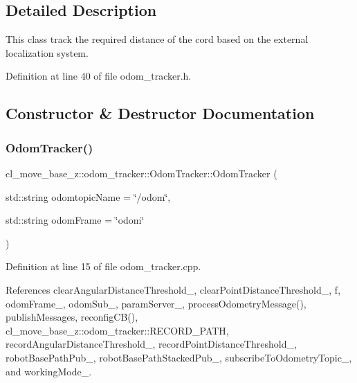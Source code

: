 \subsection{Detailed Description}
This class track the required distance of the cord based on the external localization system. 

Definition at line 40 of file odom\+\_\+tracker.\+h.



\subsection{Constructor \& Destructor Documentation}
\mbox{\label{classcl__move__base__z_1_1odom__tracker_1_1OdomTracker_a99e1f405d0b3ec3e9fc73e666793c409}} 
\subsubsection{\texorpdfstring{Odom\+Tracker()}{OdomTracker()}}
{\footnotesize\ttfamily cl\+\_\+move\+\_\+base\+\_\+z\+::odom\+\_\+tracker\+::\+Odom\+Tracker\+::\+Odom\+Tracker (\begin{DoxyParamCaption}\item[{std\+::string}]{odomtopic\+Name = {\ttfamily \char`\"{}/odom\char`\"{}},  }\item[{std\+::string}]{odom\+Frame = {\ttfamily \char`\"{}odom\char`\"{}} }\end{DoxyParamCaption})}



Definition at line 15 of file odom\+\_\+tracker.\+cpp.



References clear\+Angular\+Distance\+Threshold\+\_\+, clear\+Point\+Distance\+Threshold\+\_\+, f, odom\+Frame\+\_\+, odom\+Sub\+\_\+, param\+Server\+\_\+, process\+Odometry\+Message(), publish\+Messages, reconfig\+C\+B(), cl\+\_\+move\+\_\+base\+\_\+z\+::odom\+\_\+tracker\+::\+R\+E\+C\+O\+R\+D\+\_\+\+P\+A\+TH, record\+Angular\+Distance\+Threshold\+\_\+, record\+Point\+Distance\+Threshold\+\_\+, robot\+Base\+Path\+Pub\+\_\+, robot\+Base\+Path\+Stacked\+Pub\+\_\+, subscribe\+To\+Odometry\+Topic\+\_\+, and working\+Mode\+\_\+.


